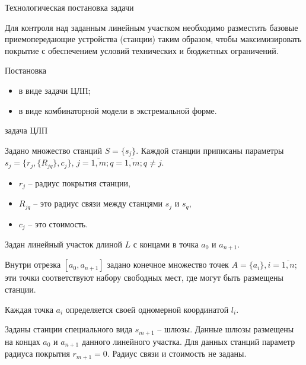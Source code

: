 \begin{frame}
    {Технологическая постановка задачи} 

    Для контроля над заданным линейным участком необходимо разместить базовые приемопередающие устройства (станции) таким образом, чтобы максимизировать покрытие с обеспечением условий технических и бюджетных ограничений. 

    \bigskip
    
    Постановка
    \begin{itemize}
        \item в виде задачи ЦЛП;
        \item в виде комбинаторной модели в экстремальной форме.
    \end{itemize}

\end{frame}


\begin{frame}
    {задача ЦЛП}


    \bigskip

    Задано множество станций $S = \{s_j\}$. Каждой станции приписаны параметры $s_j = \{r_j, \{R_{jq}\}, c_j \}$, $j = \overline{1,m}; q = \overline{1,m}; q \neq j$. 
    \begin{itemize}
        \item $r_j$ -- радиус покрытия станции,
        \item $R_{jq}$ -- это радиус связи между станцями $s_j$ и $s_q$,
        \item $c_j$ -- это стоимость.
    \end{itemize} 
    
    \bigskip

    Задан линейный участок длиной $L$ с концами в точка $a_0$ и $a_{n+1}$. 
    
    Внутри  отрезка $[a_0, a_{n+1}]$ задано конечное множество точек $A=\{a_i\}, i=\overline{1,n}$; эти точки соответствуют набору свободных мест, где могут быть размещены станции.
    
    Каждая точка $a_i$ определяется своей одномерной координатой $l_i$. 
    
    \bigskip
    
    Заданы станции специального вида $s_{m+1}$ -- шлюзы. Данные шлюзы размещены на концах $a_0$ и $a_{n+1}$ данного линейного участка. Для данных станций параметр радиуса покрытия $r_{m+1}=0$. Радиус связи и стоимость не заданы.
    \bigskip

\end{frame}

